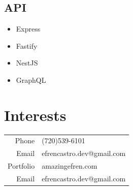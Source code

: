 \documentclass[11pt,oneside,a4paper,titlepage]{article}
\begin{document}
\begin{tcolorbox}
\begin{minipage}[t]{9cm}
\begin{tcolorbox}[grow to left by=0.55cm,colback=themeBorder,colframe=white,arc=0mm,]
      \subsection*{API}
      \begin{itemize}
        \setlength\itemsep{0em}
        \item{Express}
        \item{Fastify}
        \item{NestJS}
        \item{GraphQL}
      \end{itemize}
      \section*{Interests}
      \begin{tabular}{r l}
        Phone & (720)539-6101 \\
        Email & efrencastro.dev@gmail.com \\
        Portfolio & amazingefren.com \\
        Email & efrencastro.dev@gmail.com
      \end{tabular}
    \end{tcolorbox}
  \end{minipage}
\end{tcolorbox}
\end{document}

